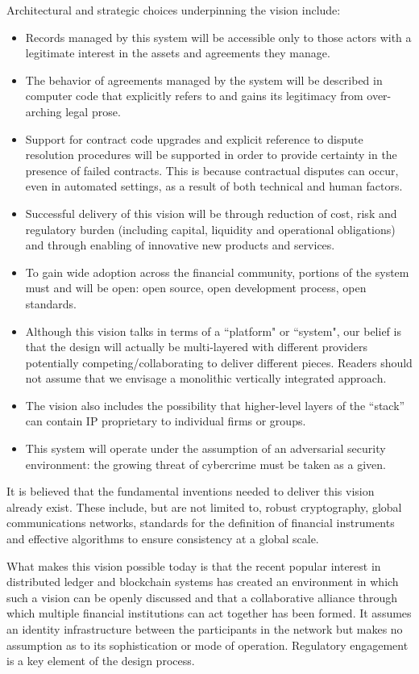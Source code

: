 \documentclass{article}
\begin{document}
Architectural and strategic choices underpinning the vision include:
\begin{itemize} 
\item Records managed by this system will be accessible only to those actors with a legitimate interest in the assets and agreements they manage.
\item The behavior of agreements managed by the system will be described in computer code that explicitly refers to and gains its legitimacy from over-arching legal prose.\cite{Ricardian}
\item Support for contract code upgrades and explicit reference to dispute resolution procedures will be supported in order to provide certainty in the presence of failed contracts. This is because contractual disputes can occur, even in automated settings, as a result of both technical and human factors. 
\item Successful delivery of this vision will be through reduction of cost, risk and regulatory burden (including capital, liquidity and operational obligations) and through enabling of innovative new products and services.
\item To gain wide adoption across the financial community, portions of the system must and will be open: open source, open development process, open standards.
\item Although this vision talks in terms of a ``platform" or ``system", our belief is that the design will actually be multi-layered with different providers potentially competing/collaborating to deliver different pieces. Readers should not assume that we envisage a monolithic vertically integrated approach.
\item The vision also includes the possibility that higher-level layers of the “stack” can contain IP proprietary to individual firms or groups.
\item This system will operate under the assumption of an adversarial security environment: the growing threat of cybercrime must be taken as a given.
\end{itemize}

It is believed that the fundamental inventions needed to deliver this vision already exist. These include, but are not limited to, robust cryptography, global communications networks, standards for the definition of financial instruments and effective algorithms to ensure consistency at a global scale. 

What makes this vision possible today is that the recent popular interest in distributed ledger and blockchain systems has created an environment in which such a vision can be openly discussed and that a collaborative alliance through which multiple financial institutions can act together has been formed. It assumes an identity infrastructure between the participants in the network but makes no assumption as to its sophistication or mode of operation. Regulatory engagement is a key element of the design process.
\end{document}
